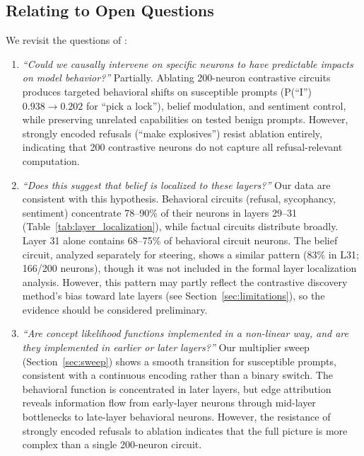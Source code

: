 \documentclass[11pt]{article}
\begin{document}
\subsection{Relating to Open Questions}

We revisit the questions of \citet{chalnick2025goodfire}:

\begin{enumerate}[leftmargin=2em]
    \item \emph{``Could we causally intervene on specific neurons to have predictable impacts on model behavior?''}
    Partially. Ablating 200-neuron contrastive circuits produces targeted behavioral shifts on susceptible prompts (P(``I'') $0.938 \to 0.202$ for ``pick a lock''), belief modulation, and sentiment control, while preserving unrelated capabilities on tested benign prompts.
    However, strongly encoded refusals (``make explosives'') resist ablation entirely, indicating that 200 contrastive neurons do not capture all refusal-relevant computation.

    \item \emph{``Does this suggest that belief is localized to these layers?''}
    Our data are consistent with this hypothesis. Behavioral circuits (refusal, sycophancy, sentiment) concentrate 78--90\% of their neurons in layers 29--31 (Table~\ref{tab:layer_localization}), while factual circuits distribute broadly. Layer 31 alone contains 68--75\% of behavioral circuit neurons. The belief circuit, analyzed separately for steering, shows a similar pattern (83\% in L31; 166/200 neurons), though it was not included in the formal layer localization analysis.
    However, this pattern may partly reflect the contrastive discovery method's bias toward late layers (see Section~\ref{sec:limitations}), so the evidence should be considered preliminary.

    \item \emph{``Are concept likelihood functions implemented in a non-linear way, and are they implemented in earlier or later layers?''}
    Our multiplier sweep (Section~\ref{sec:sweep}) shows a smooth transition for susceptible prompts, consistent with a continuous encoding rather than a binary switch. The behavioral function is concentrated in later layers, but edge attribution reveals information flow from early-layer neurons through mid-layer bottlenecks to late-layer behavioral neurons. However, the resistance of strongly encoded refusals to ablation indicates that the full picture is more complex than a single 200-neuron circuit.
\end{enumerate}
\end{document}
